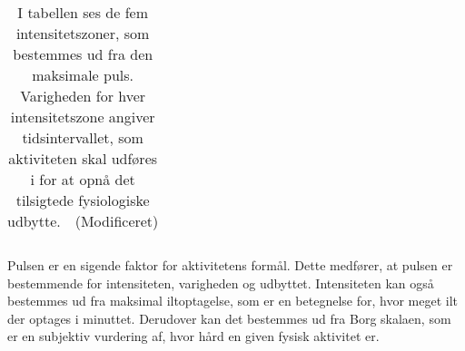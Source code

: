 \begin{table}[H]
\begin{tabular}{cccc}
	\end{tabular}
	\caption{I tabellen ses de fem intensitetszoner, som bestemmes ud fra den maksimale puls. Varigheden for hver intensitetszone angiver tidsintervallet, som aktiviteten skal udføres i for at opnå det tilsigtede fysiologiske udbytte.~\citep{Heartratejournal2015}~(Modificeret)}
	\label{tab:PA_Procentpuls}
\end{table} \vspace{-0.5cm}
Pulsen er en sigende faktor for aktivitetens formål. Dette medfører, at pulsen er bestemmende for intensiteten, varigheden og udbyttet. Intensiteten kan også bestemmes ud fra maksimal iltoptagelse, som er en betegnelse for, hvor meget ilt der optages i minuttet. Derudover kan det bestemmes ud fra Borg skalaen, som er en subjektiv vurdering af, hvor hård en given fysisk aktivitet er. \citep{Kiens2007}